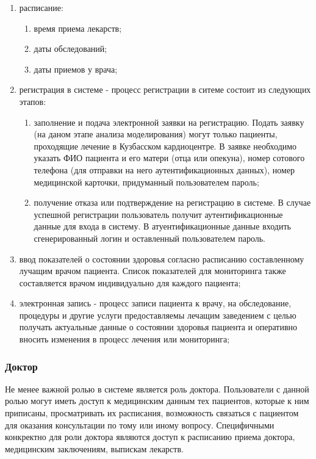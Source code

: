 \begin{enumerate}
  \item расписание:
  \begin{enumerate}
    \item время приема лекарств;
    \item даты обследований;
    \item даты приемов у врача;     
  \end{enumerate}
  \item регистрация в системе - процесс регистрации в ситеме состоит из
  следующих этапов:
  \begin{enumerate}
    \item заполнение и подача электронной заявки на регистрацию. Подать заявку
    (на даном этапе анализа моделирования) могут только пациенты, проходящие
    лечение в Кузбасском кардиоцентре. 
    В заявке необходимо указать ФИО пациента и его матери (отца или опекуна), номер сотового телефона (для отправки на него аутентификационных данных), номер медицинской карточки, придуманный пользователем пароль;
    \item получение отказа или подтверждение на регистрацию в системе. В случае
    успешной регистрации пользователь получит аутентификационные данные для
    входа в систему. В атуентификационные данные входить сгенерированный логин и
    оставленный пользователем пароль.
  \end{enumerate}
  \item ввод показателей о состоянии здоровья согласно расписанию составленному
лучащим врачом пациента. Список показателей для мониторинга также составляется
врачом индивидуально для каждого пациента;
  \item электронная запись - процесс записи пациента к врачу, на обследование,
процедуры и другие услуги предоставляемы лечащим заведением с целью получать
актуальные данные о состоянии здоровья пациента и оперативно вносить изменения в процесс лечения или мониторинга;
\end{enumerate}

\subsubsection{Доктор}
Не менее важной ролью в системе является роль доктора. Пользователи с данной ролью могут иметь доступ к медицинским данным тех пациентов, которые к ним приписаны, просматривать их расписания, возможность связаться с пациентом для оказания консультации по тому или иному вопросу. Специфичными конкректно для роли доктора являются доступ к расписанию приема доктора, медицинским заключениям, выпискам лекарств.

